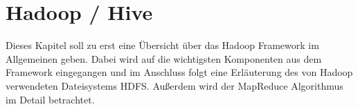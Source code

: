 \section{Hadoop / Hive}
Dieses Kapitel soll zu erst eine Übersicht über das Hadoop Framework im Allgemeinen geben. Dabei wird auf die wichtigsten Komponenten aus dem Framework eingegangen und im Anschluss folgt eine Erläuterung des von Hadoop verwendeten Dateisystems HDFS. Außerdem wird der MapReduce Algorithmus im Detail betrachtet.









